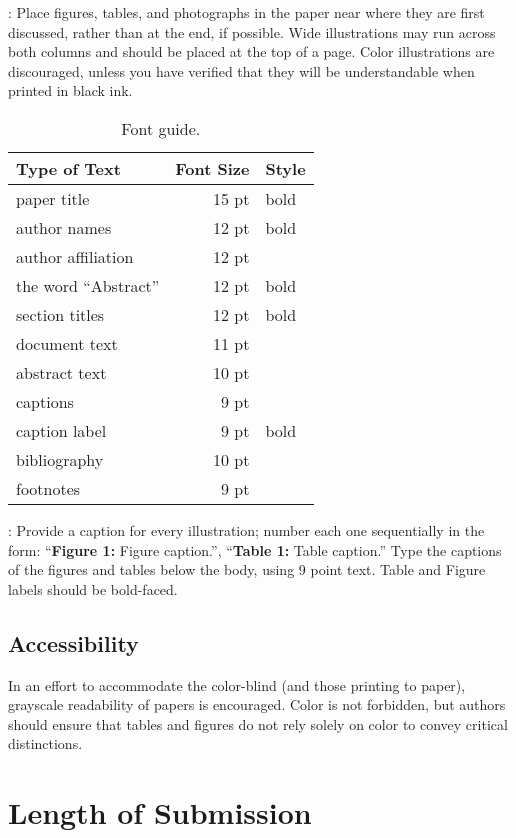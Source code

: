 \documentclass[11pt,letterpaper]{article}
\begin{document}
: Place figures, tables, and photographs in the
paper near where they are first discussed, rather than at the end, if possible.
Wide illustrations may run across both columns and should be placed at the
top of a page. Color illustrations are discouraged, unless you have verified
that they will be understandable when printed in black ink. 

\begin{table}
\small
\centering
\begin{tabular}{|l|rl|}
\hline \bf Type of Text & \bf Font Size & \bf Style \\ \hline
paper title & 15 pt & bold \\
author names & 12 pt & bold \\
author affiliation & 12 pt & \\
the word ``Abstract'' & 12 pt & bold \\
section titles & 12 pt & bold \\
document text & 11 pt  &\\
abstract text & 10 pt & \\
captions & 9 pt & \\
caption label & 9 pt & bold \\
bibliography & 10 pt & \\
footnotes & 9 pt & \\
\hline
\end{tabular}
\caption{\label{font-table} Font guide.}
\end{table}

: Provide a caption for every illustration; number each one
sequentially in the form:  ``{\bf Figure 1:} Figure caption.'',
``{\bf Table 1:} Table caption.''  Type the captions of the figures and tables
below the body, using 9 point text. Table and Figure labels should be
bold-faced.

\subsection{Accessibility}
\label{ssec:accessibility}

In an effort to accommodate the color-blind (and those printing to paper),
grayscale readability of papers is encouraged. Color is not forbidden, but 
authors should ensure that tables and figures do not rely solely on color to
convey critical distinctions.

\section{Length of Submission}
\label{sec:length}
\end{document}
